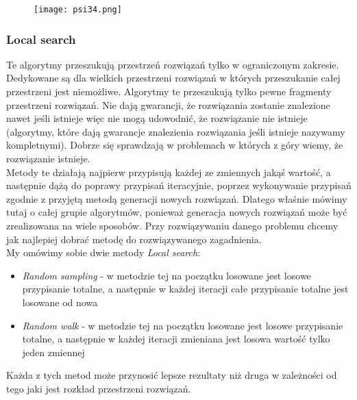 \documentclass[a4paper,15pt]{article}
\begin{document}
\begin{figure}[H]
\centerline{\texttt{[image: psi34.png]}}
\end{figure}


\subsubsection{Local search}

Te algorytmy przeszukują przestrzeń rozwiązań tylko w ograniczonym zakresie. Dedykowane są dla wielkich przestrzeni rozwiązań w których przeszukanie całej przestrzeni jest niemożliwe. Algorytmy te przeszukują tylko pewne fragmenty przestrzeni rozwiązań. Nie dają gwarancji, że rozwiązania zostanie znalezione nawet jeśli istnieje więc nie mogą udowodnić, że rozwiązanie nie istnieje (algorytmy, które dają gwarancje znalezienia rozwiązania jeśli istnieje nazywamy kompletnymi). Dobrze się sprawdzają w problemach w których z góry wiemy, że rozwiązanie istnieje. \\ 

Metody te działają najpierw przypisują każdej ze zmiennych jakąś wartość, a następnie dążą do poprawy przypisań iteracyjnie, poprzez wykonywanie przypisań zgodnie z przyjętą metodą generacji nowych rozwiązań. Dlatego właśnie mówimy tutaj o całej grupie algorytmów, ponieważ generacja nowych rozwiązań może być zrealizowana na wiele sposobów. Przy rozwiązywaniu danego problemu chcemy jak najlepiej dobrać metodę do rozwiązywanego zagadnienia. \\

My omówimy sobie dwie metody \textit{Local search}:
\begin{itemize}
\item \textit{Random sampling} - w metodzie tej na początku losowane jest losowe przypisanie totalne, a następnie w każdej iteracji całe przypisanie totalne jest losowane od nowa
\item \textit{Random walk} - w metodzie tej na początku losowane jest losowe przypisanie totalne, a następnie w każdej iteracji zmieniana jest losowa wartość tylko jeden zmiennej 
\end{itemize}

Każda z tych metod może przynosić lepsze rezultaty niż druga w zależności od tego jaki jest rozkład przestrzeni rozwiązań. 
\end{document}
